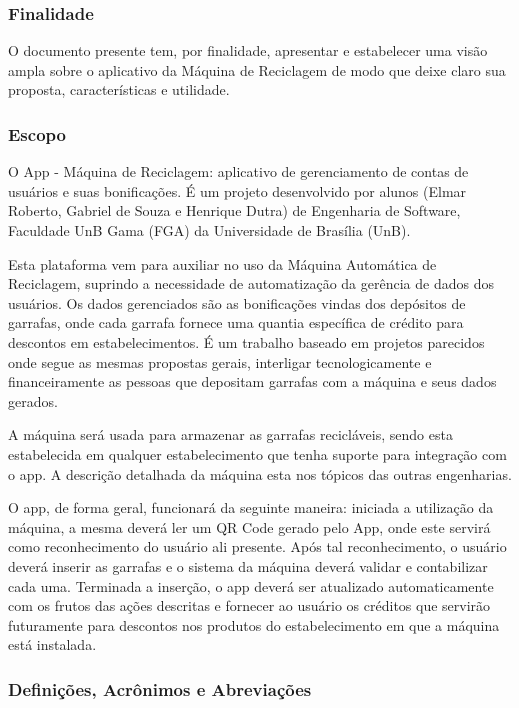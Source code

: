 \subsubsection{Finalidade}
O documento presente tem, por finalidade, apresentar e estabelecer uma visão ampla sobre o aplicativo da Máquina de Reciclagem de modo que deixe claro sua proposta, características e utilidade.

\subsubsection{Escopo}
O App - Máquina de Reciclagem: aplicativo de gerenciamento de contas de usuários e suas bonificações. É um projeto desenvolvido por alunos (Elmar Roberto, Gabriel de Souza e Henrique Dutra) de Engenharia de Software, Faculdade UnB Gama (FGA) da Universidade de Brasília (UnB).

Esta plataforma vem para auxiliar no uso da Máquina Automática de Reciclagem, suprindo a necessidade de automatização da gerência de dados dos usuários. Os dados gerenciados são as bonificações vindas dos depósitos de garrafas, onde cada garrafa fornece uma quantia específica de crédito para descontos em estabelecimentos. É um trabalho baseado em projetos parecidos onde segue as mesmas propostas gerais, interligar tecnologicamente e financeiramente as pessoas que depositam garrafas com a máquina e seus dados gerados.

A máquina será usada para armazenar as garrafas recicláveis, sendo esta estabelecida em qualquer estabelecimento que tenha suporte para integração com o app. A descrição detalhada da máquina esta nos tópicos das outras engenharias.

O app, de forma geral, funcionará da seguinte maneira: iniciada a utilização da máquina, a mesma deverá ler um QR Code gerado pelo App, onde este servirá como reconhecimento do usuário ali presente. Após tal reconhecimento, o usuário deverá inserir as garrafas e o sistema da máquina deverá validar e contabilizar cada uma. Terminada a inserção, o app deverá ser atualizado automaticamente com os frutos das ações descritas e fornecer ao usuário os créditos que servirão futuramente para descontos nos produtos do estabelecimento em que a máquina está instalada.

\subsubsection{Definições, Acrônimos e Abreviações}

